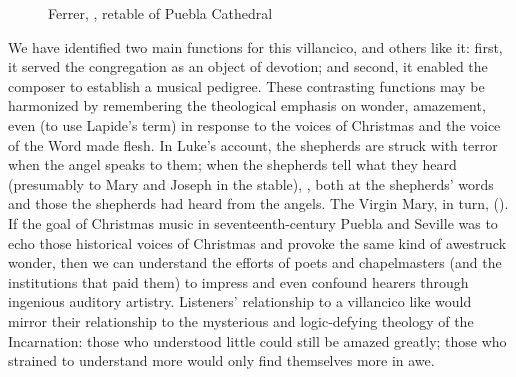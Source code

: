 \begin{figure}
    \caption{Ferrer, , retable of Puebla
    Cathedral}

    \label{fig:Puebla-Ferrer-Pastores}
\end{figure}

We have identified two main functions for this villancico, and others like it:
first, it served the congregation as an object of devotion; and second, it
enabled the composer to establish a musical pedigree.
These contrasting functions may be harmonized by remembering the theological
emphasis on wonder, amazement, even  (to use Lapide's term)
in response to the voices of Christmas and the voice of the Word made flesh.
In Luke's account, the shepherds are struck with terror when the angel speaks to
them; when the shepherds tell what they heard (presumably to Mary and Joseph in
the stable), , both at the shepherds' words
and those the shepherds had heard from the angels.
The Virgin Mary, in turn,  ().
If the goal of Christmas music in seventeenth-century Puebla and Seville was to
echo those historical voices of Christmas and provoke the same kind of awestruck
wonder, then we can understand the efforts of poets and chapelmasters (and the
institutions that paid them) to impress and even confound hearers through
ingenious auditory artistry.
Listeners' relationship to a villancico like 
would mirror their relationship to the mysterious and logic-defying theology of
the Incarnation: those who understood little could still be amazed greatly;
those who strained to understand more would only find themselves more in awe.

\endinput

